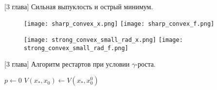 \begin{frame} {[3 глава] Сильная выпуклость и острый минимум.}
    \begin{figure}[H]
        \texttt{[image: sharp\_convex\_x.png]}
        \endminipage\hfill
        \texttt{[image: sharp\_convex\_f.png]}
        \endminipage\hfill
        \label{res_sharp_convex}
    \end{figure}
    
    \begin{figure}[H]
        \texttt{[image: strong\_convex\_small\_rad\_x.png]}
        \endminipage\hfill
        \texttt{[image: strong\_convex\_small\_rad\_f.png]}
        \endminipage\hfill
        \label{res_strong_convex}
    \end{figure}
\end{frame}


\begin{frame} {[3 глава] Алгоритм рестартов при условии $\gamma$-роста.}
\begin{algorithm}[H]
    \label{alg:rest_gamma}
    $p \gets 0$\;
    $V(x_*, x_0) \gets V(x_*,x_0^0)$\;
\end{algorithm}
\end{frame}


